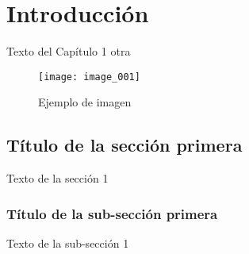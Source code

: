 
\chapter{Introducción}

Texto del Capítulo 1 \cite{AGdE-2004} otra \cite{Albin-2003}
\cite{AndresMejiaD-2007}
\cite{Bass-Clements-Kazman-1998}

\begin{figure}[h]
  \texttt{[image: image\_001]}
  \caption{Ejemplo de imagen}
  \centering
  \label{fig:ejemplo} %
\end{figure}

\section{Título de la sección primera}

Texto de la sección 1 


\subsection{Título de la sub-sección primera}

Texto de la sub-sección 1

